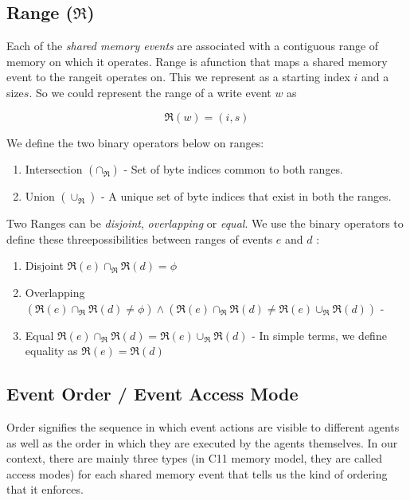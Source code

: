     \subsection{Range ($\Re$)}
        Each of the \textit{shared memory events} are associated with a contiguous range of memory on which it operates. Range is afunction that maps a shared memory event to the range\footnotemark it operates on. This we represent as a starting index $i$ and a size$s$. So we could represent the range of a write event $w$ as 
                
                \[\Re(w) = (i, s) \]
    
        
        We define the two binary operators below on ranges: 
        \begin{enumerate}
            \item Intersection $(\cap{_\Re})$ - Set of byte indices common to both ranges.
            \item Union $(\cup_\Re)$ - A unique set of byte indices that exist in both the ranges.  
        \end{enumerate}
        
        Two Ranges can be \textit{disjoint}, \textit{overlapping} or \textit{equal}. We use the binary operators to define these threepossibilities between ranges of events $e$ and $d$ :
        \begin{enumerate}
            \item Disjoint $\Re(e) \cap_\Re \Re(d) = \phi$ 
            \item Overlapping $(\Re(e)\cap_\Re \Re(d) \neq \phi) \wedge (\Re(e) \cap_\Re  \Re(d) \neq \Re(e) \cup_\Re \Re(d))$ - 
            \item Equal $\Re(e) \cap_\Re  \Re(d) = \Re(e) \cup_\Re \Re(d)$ - In simple terms, we define equality as $\Re(e) = \Re(d)$
        \end{enumerate}
            
    
    \subsection{Event Order / Event Access Mode} 
        Order signifies the sequence in which event actions are visible to different agents as well as the order in which they are executed by the agents themselves. In our context, there are mainly three types (in C11 memory model, they are called access modes) for each shared memory event that tells us the kind of ordering that it enforces. 
        
